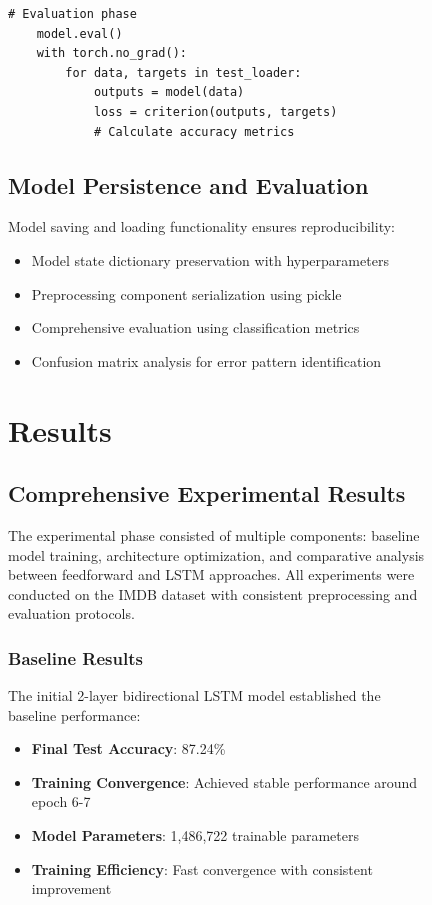 \documentclass[a4paper, journal]{IEEEtran}
\begin{document}
\begin{figure}[!t]
\begin{lstlisting}[caption=Training Loop Implementation]
    # Evaluation phase
    model.eval()
    with torch.no_grad():
        for data, targets in test_loader:
            outputs = model(data)
            loss = criterion(outputs, targets)
            # Calculate accuracy metrics
\end{lstlisting}

\subsection{Model Persistence and Evaluation}

Model saving and loading functionality ensures reproducibility:

\begin{itemize}
    \item Model state dictionary preservation with hyperparameters
    \item Preprocessing component serialization using pickle
    \item Comprehensive evaluation using classification metrics
    \item Confusion matrix analysis for error pattern identification
\end{itemize}



\section{Results}

\subsection{Comprehensive Experimental Results}

The experimental phase consisted of multiple components: baseline model training, architecture optimization, and comparative analysis between feedforward and LSTM approaches. All experiments were conducted on the IMDB dataset with consistent preprocessing and evaluation protocols.

\subsubsection{Baseline Results}

The initial 2-layer bidirectional LSTM model established the baseline performance:

\begin{itemize}
    \item \textbf{Final Test Accuracy}: 87.24\%
    \item \textbf{Training Convergence}: Achieved stable performance around epoch 6-7
    \item \textbf{Model Parameters}: 1,486,722 trainable parameters
    \item \textbf{Training Efficiency}: Fast convergence with consistent improvement
\end{itemize}


\end{figure}
\end{document}
